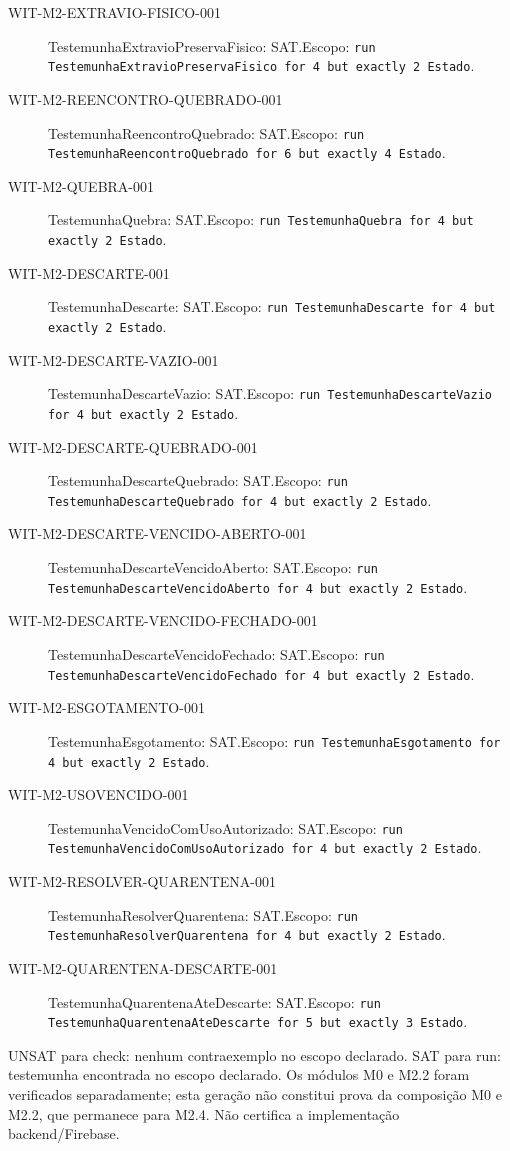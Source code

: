 \begin{description}
\item[WIT-M2-EXTRAVIO-FISICO-001] TestemunhaExtravioPreservaFisico: SAT.\newline Escopo: \texttt{run TestemunhaExtravioPreservaFisico for 4 but exactly 2 Estado}.
\item[WIT-M2-REENCONTRO-QUEBRADO-001] TestemunhaReencontroQuebrado: SAT.\newline Escopo: \texttt{run TestemunhaReencontroQuebrado for 6 but exactly 4 Estado}.
\item[WIT-M2-QUEBRA-001] TestemunhaQuebra: SAT.\newline Escopo: \texttt{run TestemunhaQuebra for 4 but exactly 2 Estado}.
\item[WIT-M2-DESCARTE-001] TestemunhaDescarte: SAT.\newline Escopo: \texttt{run TestemunhaDescarte for 4 but exactly 2 Estado}.
\item[WIT-M2-DESCARTE-VAZIO-001] TestemunhaDescarteVazio: SAT.\newline Escopo: \texttt{run TestemunhaDescarteVazio for 4 but exactly 2 Estado}.
\item[WIT-M2-DESCARTE-QUEBRADO-001] TestemunhaDescarteQuebrado: SAT.\newline Escopo: \texttt{run TestemunhaDescarteQuebrado for 4 but exactly 2 Estado}.
\item[WIT-M2-DESCARTE-VENCIDO-ABERTO-001] TestemunhaDescarteVencidoAberto: SAT.\newline Escopo: \texttt{run TestemunhaDescarteVencidoAberto for 4 but exactly 2 Estado}.
\item[WIT-M2-DESCARTE-VENCIDO-FECHADO-001] TestemunhaDescarteVencidoFechado: SAT.\newline Escopo: \texttt{run TestemunhaDescarteVencidoFechado for 4 but exactly 2 Estado}.
\item[WIT-M2-ESGOTAMENTO-001] TestemunhaEsgotamento: SAT.\newline Escopo: \texttt{run TestemunhaEsgotamento for 4 but exactly 2 Estado}.
\item[WIT-M2-USOVENCIDO-001] TestemunhaVencidoComUsoAutorizado: SAT.\newline Escopo: \texttt{run TestemunhaVencidoComUsoAutorizado for 4 but exactly 2 Estado}.
\item[WIT-M2-RESOLVER-QUARENTENA-001] TestemunhaResolverQuarentena: SAT.\newline Escopo: \texttt{run TestemunhaResolverQuarentena for 4 but exactly 2 Estado}.
\item[WIT-M2-QUARENTENA-DESCARTE-001] TestemunhaQuarentenaAteDescarte: SAT.\newline Escopo: \texttt{run TestemunhaQuarentenaAteDescarte for 5 but exactly 3 Estado}.
\end{description}
UNSAT para check: nenhum contraexemplo no escopo declarado. SAT para run: testemunha encontrada no escopo declarado. Os módulos M0 e M2.2 foram verificados separadamente; esta geração não constitui prova da composição M0 e M2.2, que permanece para M2.4. Não certifica a implementação backend/Firebase.
